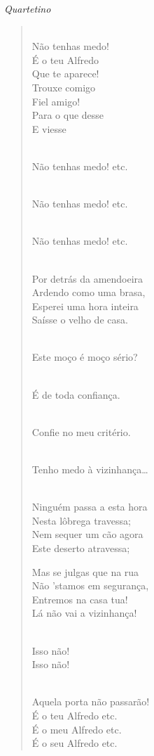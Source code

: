 {\smallskip\raggedleft\itshape Quartetino\par}
\begin{verse}

 \\
Não tenhas medo!\\
É o teu Alfredo\\
Que te aparece!\\
Trouxe comigo\\
Fiel amigo!\\
Para o que desse\\
E viesse


\\
Não tenhas medo! etc.


\\
Não tenhas medo! etc.


\\
Não tenhas medo! etc.


\\
Por detrás da amendoeira\\
Ardendo como uma brasa,\\
Esperei uma hora inteira\\
Saísse o velho de casa.

 \\
Este moço é moço sério?

\\
É de toda confiança.

\pagebreak

\\
Confie no meu critério.

\\
Tenho medo à vizinhança\ldots{}

\\
Ninguém passa a esta hora\\
Nesta lôbrega travessa;\\
Nem sequer um cão agora\\
Este deserto atravessa;

Mas se julgas que na rua\\
Não 'stamos em segurança,\\
Entremos na casa tua!\\
Lá não vai a vizinhança!

\\
Isso não!\\ 
Isso não!


\\
Aquela porta não passarão!\\
É o teu Alfredo etc.\\
É o meu  Alfredo etc.\\
É o seu Alfredo etc.
\end{verse}

